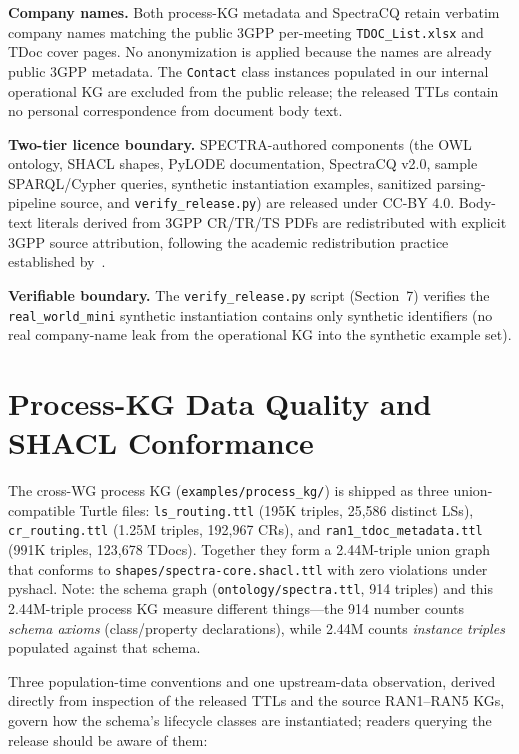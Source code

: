 \noindent\textbf{Company names.} Both process-KG metadata and SpectraCQ retain verbatim company names matching the public 3GPP per-meeting \texttt{TDOC\_List.xlsx} and TDoc cover pages. No anonymization is applied because the names are already public 3GPP metadata. The \texttt{Contact} class instances populated in our internal operational KG are excluded from the public release; the released TTLs contain no personal correspondence from document body text.

\noindent\textbf{Two-tier licence boundary.} SPECTRA-authored components (the OWL ontology, SHACL shapes, PyLODE documentation, SpectraCQ v2.0, sample SPARQL/Cypher queries, synthetic instantiation examples, sanitized parsing-pipeline source, and \texttt{verify\_release.py}) are released under CC-BY 4.0. Body-text literals derived from 3GPP CR/TR/TS PDFs are redistributed with explicit 3GPP source attribution, following the academic redistribution practice established by~\cite{nikbakht2024tspec,gsma2026telecomkg}.

\noindent\textbf{Verifiable boundary.} The \texttt{verify\_release.py} script (Section~7) verifies the \texttt{real\_world\_mini} synthetic instantiation contains only synthetic identifiers (no real company-name leak from the operational KG into the synthetic example set).

\section{Process-KG Data Quality and SHACL Conformance}\label{app:dq}

The cross-WG process KG (\texttt{examples/process\_kg/}) is shipped as three union-compatible Turtle files: \texttt{ls\_routing.ttl} (195K triples, 25,586 distinct LSs), \texttt{cr\_routing.ttl} (1.25M triples, 192,967 CRs), and \texttt{ran1\_tdoc\_metadata.ttl} (991K triples, 123,678 TDocs). Together they form a 2.44M-triple union graph that conforms to \texttt{shapes/\bk spectra-core.\bk shacl.\bk ttl} with zero violations under pyshacl. Note: the schema graph (\texttt{ontology/spectra.ttl}, 914 triples) and this 2.44M-triple process KG measure different things---the 914 number counts \emph{schema axioms} (class/property declarations), while 2.44M counts \emph{instance triples} populated against that schema.

Three population-time conventions and one upstream-data observation, derived directly from inspection of the released TTLs and the source RAN1--RAN5 KGs, govern how the schema's lifecycle classes are instantiated; readers querying the release should be aware of them:

